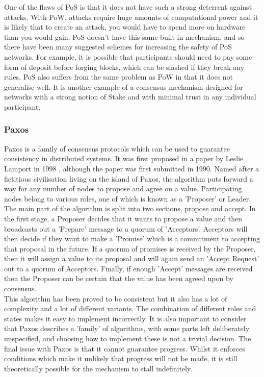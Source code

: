 \documentclass[12pt,a4paper,twoside,openright]{report}
\begin{document}
			One of the flaws of PoS is that it does not have such a strong deterrent against attacks.
			With PoW, attacks require huge amounts of computational power and it is likely that to create an attack, you would have to spend more on hardware than you would gain. 
			PoS doesn't have this same built in mechanism, and so there have been many suggested schemes for increasing the safety of PoS networks.
			For example, it is possible that participants should need to pay some form of deposit before forging blocks, which can be slashed if they break any rules. 
			PoS also suffers from the same problem as PoW in that it does not generalise well. 
			It is another example of a consensus mechanism designed for networks with a strong notion of Stake and with minimal trust in any individual participant.

			\subsubsection*{Paxos}
			Paxos is a family of consensus protocols which can be used to guarantee consistency in distributed systems. 
			It was first proposed in a paper by Leslie Lamport in 1998 \cite{Paxos}, although the paper was first submitted in 1990.
			Named after a fictitious civilisation living on the island of Paxos, the algorithm puts forward a way for any number of nodes to propose and agree on a value.
			Participating nodes belong to various roles, one of which is known as a 'Proposer' or Leader.\\

			The main part of the algorithm is split into two sections, propose and accept.
			In the first stage, a Proposer decides that it wants to propose a value and then broadcasts out a 'Prepare' message to a quorum of 'Acceptors'.
			Acceptors will then decide if they want to make a 'Promise' which is a commitment to accepting that proposal in the future. 
			If a quorum of promises is received by the Proposer, then it will assign a value to its proposal and will again send an 'Accept Request' out to a quorum of Acceptors.
			Finally, if enough 'Accept' messages are received then the Proposer can be certain that the value has been agreed upon by consensus.\\

			This algorithm has been proved to be consistent but it also has a lot of complexity and a lot of different variants. 
			The combination of different roles and states makes it easy to implement incorrectly.
			It is also important to consider that Paxos describes a 'family' of algorithms, with some parts left deliberately unspecified, and choosing how to implement these is not a trivial decision.
			The final issue with Paxos is that it cannot guarantee progress.
			Whilst it enforces conditions which make it unlikely that progress will not be made, it is still theoretically possible for the mechanism to stall indefinitely.
\end{document}
